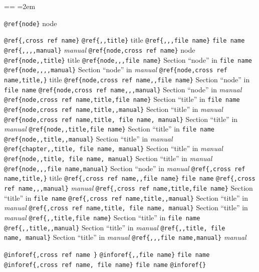 \documentclass{book}
\makeatletter
\newenvironment{GNUTexinfopreformatted}{%
  \par\obeylines\obeyspaces\frenchspacing
  \parskip=\z@\parindent=\z@}{}
\makeatother
\begin{document}
\begin{GNUTexinfopreformatted}
\leftskip=2em\relax\ttfamily%

\texttt{@ref\{node\}} node

\texttt{@ref\{,cross ref name\}} 
\texttt{@ref\{{,}{,}title\}} title
\texttt{@ref\{{,}{,},file name\}} \texttt{file name}
\texttt{@ref\{{,}{,}{,}{,}manual\}} \textsl{manual}
\texttt{@ref\{node,cross ref name\}} node
\texttt{@ref\{node{,}{,}title\}} title
\texttt{@ref\{node{,}{,},file name\}} Section ``node'' in \texttt{file name}
\texttt{@ref\{node{,}{,}{,}{,}manual\}} Section ``node'' in \textsl{manual}
\texttt{@ref\{node,cross ref name,title,\}} title
\texttt{@ref\{node,cross ref name{,}{,}file name\}} Section ``node'' in \texttt{file name}
\texttt{@ref\{node,cross ref name{,}{,},manual\}} Section ``node'' in \textsl{manual}
\texttt{@ref\{node,cross ref name,title,file name\}} Section ``title'' in \texttt{file name}
\texttt{@ref\{node,cross ref name,title{,}{,}manual\}} Section ``title'' in \textsl{manual}
\texttt{@ref\{node,cross ref name,title,\ file name,\ manual\}} Section ``title'' in \textsl{manual}
\texttt{@ref\{node{,}{,}title,file name\}} Section ``title'' in \texttt{file name}
\texttt{@ref\{node{,}{,}title{,}{,}manual\}} Section ``title'' in \textsl{manual}
\texttt{@ref\{chapter{,}{,}title,\ file name,\ manual\}} Section ``title'' in \textsl{manual}
\texttt{@ref\{node{,}{,}title,\ file name,\ manual\}} Section ``title'' in \textsl{manual}
\texttt{@ref\{node{,}{,},file name,manual\}} Section ``node'' in \textsl{manual}
\texttt{@ref\{,cross ref name,title,\}} title
\texttt{@ref\{,cross ref name{,}{,}file name\}} \texttt{file name}
\texttt{@ref\{,cross ref name{,}{,},manual\}} \textsl{manual}
\texttt{@ref\{,cross ref name,title,file name\}} Section ``title'' in \texttt{file name}
\texttt{@ref\{,cross ref name,title{,}{,}manual\}} Section ``title'' in \textsl{manual}
\texttt{@ref\{,cross ref name,title,\ file name,\ manual\}} Section ``title'' in \textsl{manual}
\texttt{@ref\{{,}{,}title,file name\}} Section ``title'' in \texttt{file name}
\texttt{@ref\{{,}{,}title{,}{,}manual\}} Section ``title'' in \textsl{manual}
\texttt{@ref\{{,}{,}title,\ file name,\ manual\}} Section ``title'' in \textsl{manual}
\texttt{@ref\{{,}{,},file name,manual\}} \textsl{manual}

\texttt{@inforef\{,cross ref name \}} 
\texttt{@inforef\{{,}{,}file name\}} \texttt{file name}
\texttt{@inforef\{,cross ref name,\ file name\}} \texttt{file name}
\texttt{@inforef\{\}} 


\end{GNUTexinfopreformatted}
\end{document}
